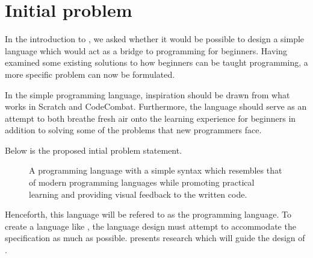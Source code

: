 \section{Initial problem}\label{sec:initial_problem}
In the introduction to , we asked whether it would be possible to design a simple language which would act as a bridge to programming for beginners.
Having examined some existing solutions to how beginners can be taught programming, a more specific problem can now be formulated.

In the simple programming language, inspiration should be drawn from what works in Scratch and CodeCombat. Furthermore, the language should serve as an attempt to both breathe fresh air onto the learning experience for beginners in addition to solving some of the problems that new programmers face.

Below is the proposed intial problem statement.

\begin{figure}[h]
    \vspace{0.5cm}
    \centering
    \begin{framed}
        A programming language with a simple syntax which resembles that of modern programming languages while promoting practical learning and providing visual feedback to the written code.
    \end{framed}
    \vspace{-0.5cm}
    \label{fig:dazel_specification}
    \vspace{0.5cm}
\end{figure}

Henceforth, this language will be refered to as the \textit{\dazel{}} programming language.
To create a language like \dazel{}, the language design must attempt to accommodate the specification as much as possible.  presents research which will guide the design of \dazel{}.